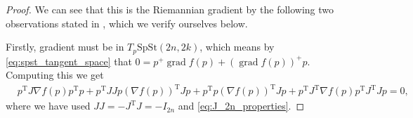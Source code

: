 \begin{proof}
    We can see that this is the Riemannian gradient by the following two observations stated in \cite[p.~12]{BendokatZimmermann2021}, which we verify ourselves below.

    Firstly, gradient must be in $T_{p}\mathrm{SpSt}(2n, 2k)$, which means by \eqref{eq:spst_tangent_space} that $0=p^{+}\operatorname{grad}f(p)+(\operatorname{grad}f(p))^{+}p$. Computing this we get 
    \begin{equation*}
        \begin{split}
        &p^{\mathrm{T}}J\nabla f(p)p^{\mathrm{T}}p+p^{\mathrm{T}}JJp(\nabla f(p))^{\mathrm{T}}Jp+p^{\mathrm{T}}p(\nabla f(p))^{\mathrm{T}}Jp+p^{\mathrm{T}}J^{\mathrm{T}}\nabla f(p)p^{\mathrm{T}}J^{\mathrm{T}}Jp=0,
        \end{split}
    \end{equation*}
    where we have used $JJ=-J^{\mathrm{T}}J=-I_{2n}$ and \eqref{eq:J_2n_properties}.
    

\end{proof}
